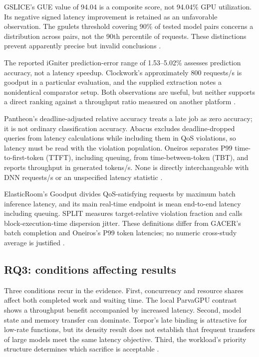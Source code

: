 GSLICE's GUE value of 94.04 is a composite score, not 94.04\% GPU utilization. Its negative signed latency improvement is retained as an unfavorable observation. The gpulets threshold covering 90\% of tested model pairs concerns a distribution across pairs, not the 90th percentile of requests. These distinctions prevent apparently precise but invalid conclusions \cite{P003,P008}.

The reported iGniter prediction-error range of 1.53--5.02\% assesses prediction accuracy, not a latency speedup. Clockwork's approximately 800 requests/s is goodput in a particular evaluation, and the supplied extraction notes a nonidentical comparator setup. Both observations are useful, but neither supports a direct ranking against a throughput ratio measured on another platform \cite{P002,P009}.

Pantheon's deadline-adjusted relative accuracy treats a late job as zero accuracy; it is not ordinary classification accuracy. Abacus excludes deadline-dropped queries from latency calculations while including them in QoS violations, so latency must be read with the violation population. Oneiros separates P99 time-to-first-token (TTFT), including queuing, from time-between-token (TBT), and reports throughput in generated tokens/s. None is directly interchangeable with DNN requests/s or an unspecified latency statistic \cite{s022,s025,s026}.

ElasticRoom's Goodput divides QoS-satisfying requests by maximum batch inference latency, and its main real-time endpoint is mean end-to-end latency including queuing. SPLIT measures target-relative violation fraction and calls block-execution-time dispersion jitter. These definitions differ from GACER's batch completion and Oneiros's P99 token latencies; no numeric cross-study average is justified \cite{s027,s028,s029,s026}.

\subsection{RQ3: conditions affecting results}
Three conditions recur in the evidence. First, concurrency and resource shares affect both completed work and waiting time. The local ParvaGPU contrast shows a throughput benefit accompanied by increased latency. Second, model state and memory transfer can dominate. Torpor's late binding is attractive for low-rate functions, but its density result does not establish that frequent transfers of large models meet the same latency objective. Third, the workload's priority structure determines which sacrifice is acceptable \cite{P011,P012}.

